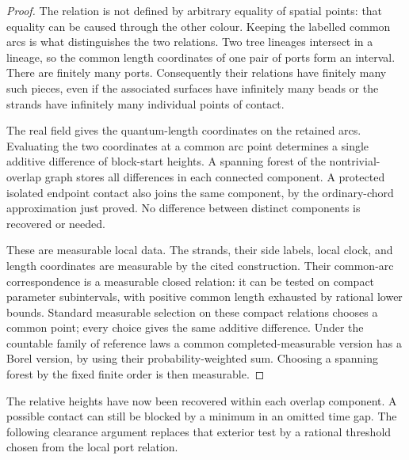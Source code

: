 \begin{proof}
The relation is not defined by arbitrary equality of spatial points: that equality can be caused through the other colour. Keeping the labelled common arcs is what distinguishes the two relations. Two tree lineages intersect in a lineage, so the common length coordinates of one pair of ports form an interval. There are finitely many ports. Consequently their relations have finitely many such pieces, even if the associated surfaces have infinitely many beads or the strands have infinitely many individual points of contact.

The real field gives the quantum-length coordinates on the retained arcs. Evaluating the two coordinates at a common arc point determines a single additive difference of block-start heights. A spanning forest of the nontrivial-overlap graph stores all differences in each connected component. A protected isolated endpoint contact also joins the same component, by the ordinary-chord approximation just proved. No difference between distinct components is recovered or needed.

These are measurable local data. The strands, their side labels, local clock, and length coordinates are measurable by the cited construction. Their common-arc correspondence is a measurable closed relation: it can be tested on compact parameter subintervals, with positive common length exhausted by rational lower bounds. Standard measurable selection on these compact relations chooses a common point; every choice gives the same additive difference. Under the countable family of reference laws a common completed-measurable version has a Borel version, by using their probability-weighted sum. Choosing a spanning forest by the fixed finite order is then measurable.
\end{proof}

The relative heights have now been recovered within each overlap component.
A possible contact can still be blocked by a minimum in an omitted time
gap. The following clearance argument replaces that exterior test by a
rational threshold chosen from the local port relation.

